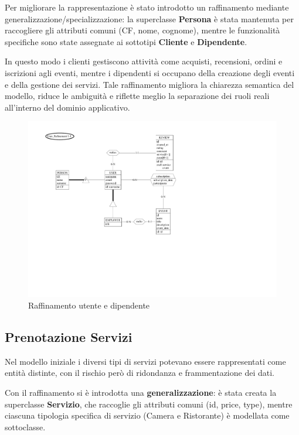 \documentclass[a4paper,12pt]{report}
\begin{document}
\vspace{\baselineskip}
Per migliorare la rappresentazione è stato introdotto un raffinamento mediante 
generalizzazione/specializzazione: la superclasse \textbf{Persona} è stata mantenuta per 
raccogliere gli attributi comuni (CF, nome, cognome), mentre le funzionalità specifiche sono 
state assegnate ai sottotipi \textbf{Cliente} e \textbf{Dipendente}.

\vspace{\baselineskip}
In questo modo i clienti gestiscono attività come acquisti, recensioni, ordini e iscrizioni agli 
eventi, mentre i dipendenti si occupano della creazione degli eventi e della gestione dei 
servizi. Tale raffinamento migliora la chiarezza semantica del modello, riduce le ambiguità e 
riflette meglio la separazione dei ruoli reali all'interno del dominio applicativo.
\begin{figure}[H]
	\centering
	\includegraphics[width=\textwidth, trim=0 200pt 300pt 0, clip]{./schemas/refinements/user.pdf}
	\caption{Raffinamento utente e dipendente}
	\label{fig:raffinamento-utente}
\end{figure}

\newpage
\subsection{Prenotazione Servizi}
Nel modello iniziale i diversi tipi di servizi potevano essere rappresentati come entità 
distinte, con il rischio però di ridondanza e frammentazione dei dati.

\vspace{\baselineskip}
Con il raffinamento si è introdotta una \textbf{generalizzazione}: è stata creata la superclasse 
\textbf{Servizio}, che raccoglie gli attributi comuni (id, price, type), mentre ciascuna 
tipologia specifica di servizio (Camera e Ristorante) è modellata come sottoclasse.
\end{document}
